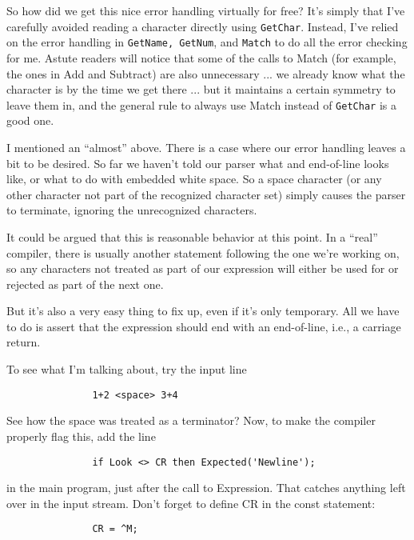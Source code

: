 So how did we get this nice error handling  virtually  for  free?  It's simply  that  I've  carefully  avoided  reading  a character directly  using  {\tt GetChar}. Instead, I've  relied  on  the  error handling in {\tt GetName, GetNum}, and  {\tt Match}  to  do  all  the error checking for me. Astute  readers  will notice that some of the calls to Match (for example, the ones in Add  and  Subtract)  are also unnecessary ... we already know what the character is by the time  we get there ... but it maintains  a  certain  symmetry  to leave them in, and  the  general rule to always use Match instead of {\tt GetChar} is a good one.

I mentioned an ``almost'' above. There  is a case where our error handling  leaves a bit to be desired. So far we haven't told our parser what and  end-of-line  looks  like, or  what  to  do with embedded  white  space. So  a  space  character  (or  any  other character not part of the recognized character set) simply causes the parser to terminate, ignoring the unrecognized characters.

It  could  be  argued  that  this is reasonable behavior at  this point. In a ``real''  compiler, there is usually another statement following the one we're working on, so any characters not treated as part of our expression will either be used for or  rejected as part of the next one.

But  it's  also a very easy thing to fix up, even  if  it's  only temporary. All  we  have  to  do  is assert that the expression should end with an end-of-line, i.e., a carriage return.

To see what I'm talking about, try the input line

\begin{verbatim}
               1+2 <space> 3+4
\end{verbatim}

See  how the space was treated as a terminator?  Now, to make the compiler properly flag this, add the line

\begin{verbatim}
               if Look <> CR then Expected('Newline');
\end{verbatim}

in the main  program, just  after  the call to Expression. That catches anything left over in the input stream. Don't  forget to define CR in the const statement:

\begin{verbatim}
               CR = ^M;
\end{verbatim}

